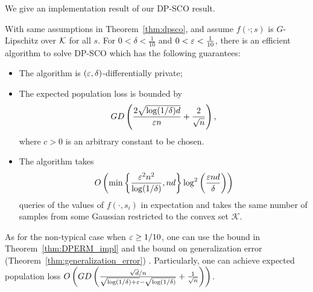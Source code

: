 



We give an implementation result of our DP-SCO result.
\begin{theorem}
\label{thm:dpsco_impl}
With same assumptions in Theorem~\ref{thm:dpsco}, and assume $f(\cdot;s)$ is $G$-Lipschitz over $\mathcal K$ for all $s$.
For $0<\delta<\frac{1}{10}$ and $0 < \varepsilon<\frac{1}{10}$, there is an efficient algorithm to solve DP-SCO which has the following guarantees:
\begin{itemize}
    \item The algorithm is $(\varepsilon,\delta)$-differentially private;
    \item The expected population loss is bounded by
    \begin{align*}
        GD\left(\frac{2\sqrt{\log(1/\delta)d}}{\varepsilon n}+\frac{2}{\sqrt{n}}\right),
    \end{align*}
    where $c>0$ is an arbitrary constant to be chosen. 
    \item The algorithm takes 
    \begin{align*}
        O\left(\min\left\{\frac{\varepsilon^2n^2}{\log(1/\delta)},nd\right\}\log^2\left(\frac{\varepsilon nd}{\delta}\right)\right)
    \end{align*}
    queries of the values of $f(\cdot,s_i)$ in expectation and takes the same number of samples from some Gaussian restricted to the convex set $\mathcal{K}$.
\end{itemize}
\end{theorem}
\begin{remark}
As for the non-typical case when $\varepsilon\geq 1/10$, one can use the bound in Theorem~\ref{thm:DPERM_impl} and the bound on generalization error (Theorem~\ref{thm:generalization_error}) .
Particularly, one can achieve expected population loss $O\left( GD\left(\frac{\sqrt{d}/n}{\sqrt{\log(1/\delta)+\varepsilon}-\sqrt{\log(1/\delta)}}+\frac{1}{\sqrt{n}}\right)\right)$.
\end{remark}

